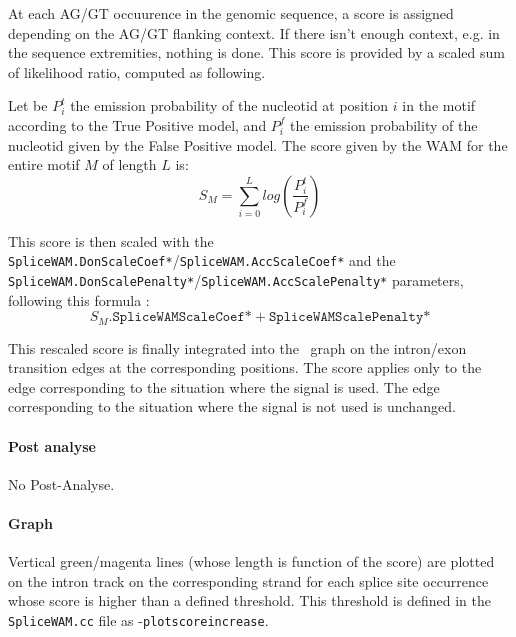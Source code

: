 At each AG/GT occuurence in the genomic sequence, a score is assigned
depending on the AG/GT flanking context. If there isn't enough
context, e.g. in the sequence extremities, nothing is done.  This
score is provided by a scaled sum of likelihood ratio, computed as
following.

Let be $P^t_i$ the emission probability of the nucleotid at position
$i$ in the motif according to the True Positive model, and $P^f_i$ the
emission probability of the nucleotid given by the False Positive
model. The score given by the WAM for the entire motif $M$ of length
$L$ is:
\[ S_M = \sum_{i=0}^{L} log\left(\frac{P^t_i}{P^f_i}\right) \]

This score is then scaled with the
\texttt{SpliceWAM.DonScaleCoef*}/\texttt{SpliceWAM.AccScaleCoef*} and
the
\texttt{SpliceWAM.DonScalePenalty*}/\texttt{SpliceWAM.AccScalePenalty*}
parameters, following this formula :
$$S_M . \texttt{SpliceWAMScaleCoef*} + \texttt{SpliceWAMScalePenalty*}$$

This rescaled score is finally integrated into the \EuGene\ graph on
the intron/exon transition edges at the corresponding positions. The
score applies only to the edge corresponding to the situation where
the signal is used. The edge corresponding to the situation where the
signal is not used is unchanged.

\paragraph{Post analyse}

No Post-Analyse.

\paragraph{Graph}

Vertical green/magenta lines (whose length is function of the score)
are plotted on the intron track on the corresponding strand for each
splice site occurrence whose score is higher than a defined
threshold. This threshold is defined in the \texttt{SpliceWAM.cc} file
as -\texttt{plotscoreincrease}.
